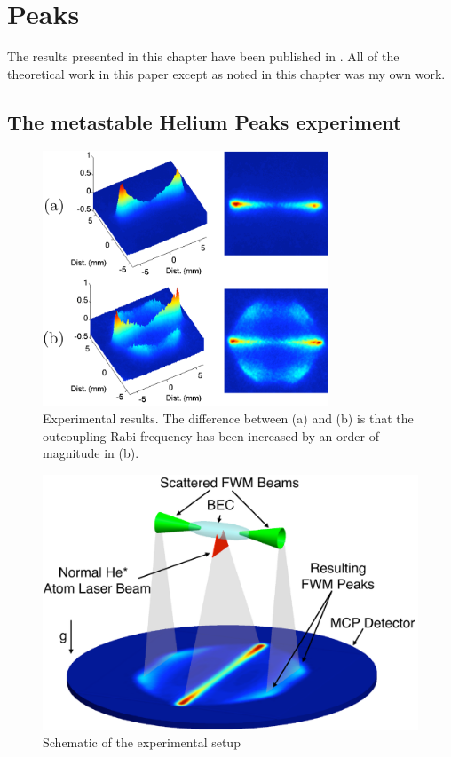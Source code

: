 \chapter{Peaks}
\label{Peaks}
\graphicspath{{Figures/Peaks/}}

The results presented in this chapter have been published in \citet{Dall:2009}. All of the theoretical work in this paper except as noted in this chapter was my own work.

\section{The metastable Helium Peaks experiment}

\begin{figure}[htbp]
    \centering
        \includegraphics[height=3in]{ExperimentalResults}
    \caption{Experimental results. The difference between (a) and (b) is that the outcoupling Rabi frequency has been increased by an order of magnitude in (b).}
    \label{Peaks:ExperimentalResults}
\end{figure}

\begin{figure}[htbp]
    \centering
        \includegraphics[height=3in]{Schematic}
    \caption{Schematic of the experimental setup}
    \label{Peaks:Schematic}
\end{figure}


